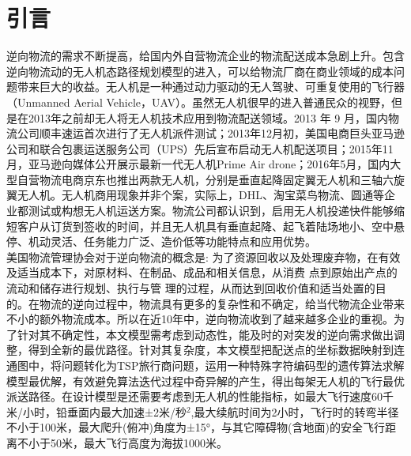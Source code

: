\documentclass[10.5pt,twocolumn]{jbuaa}
\begin{document}
	\wuhao 


	\enlargethispage{-3.3cm}
	\section{引言}
	逆向物流的需求不断提高，给国内外自营物流企业的物流配送成本急剧上升。包含逆向物流动的无人机态路径规划模型的进入，可以给物流厂商在商业领域的成本问题带来巨大的收益。无人机是一种通过动力驱动的无人驾驶、可重复使用的飞行器（Unmanned Aerial Vehicle，UAV）。虽然无人机很早的进入普通民众的视野，但是在2013年之前却无人将无人机技术应用到物流配送领域。2013 年 9
	月，国内物流公司顺丰速运首次进行了无人机派件测试；2013年12月初，美国电商巨头亚马逊公司和联合包裹运送服务公司（UPS）先后宣布启动无人机配送项目；2015年11月，亚马逊向媒体公开展示最新一代无人机Prime Air drone；2016年5月，国内大型自营物流电商京东也推出两款无人机，分别是垂直起降固定翼无人机和三轴六旋翼无人机。无人机商用现象并非个案，实际上，DHL、淘宝菜鸟物流、圆通等企业都测试或构想无人机运送方案。物流公司都认识到，启用无人机投递快件能够缩短客户从订货到签收的时间，并且无人机具有垂直起降、起飞着陆场地小、空中悬停、机动灵活、任务能力广泛、造价低等功能特点和应用优势。
	\\\indent{}美国物流管理协会对于逆向物流的概念是: 为了资源回收以及处理废弃物，在有效及适当成本下，对原材料、在制品、成品和相关信息，从消费 点到原始出产点的流动和储存进行规划、执行与管 理的过程，从而达到回收价值和适当处置的目的。在物流的逆向过程中，物流具有更多的复杂性和不确定，给当代物流企业带来不小的额外物流成本。所以在近10年中，逆向物流收到了越来越多企业的重视。为了针对其不确定性，本文模型需考虑到动态性，能及时的对突发的逆向需求做出调整，得到全新的最优路径。针对其复杂度，本文模型把配送点的坐标数据映射到连通图中，将问题转化为TSP旅行商问题，运用一种特殊字符编码型的遗传算法求解模型最优解，有效避免算法迭代过程中奇异解的产生，得出每架无人机的飞行最优派送路径。在设计模型是还需要考虑到无人机的性能指标，如最大飞行速度60千米/小时，铅垂面内最大加速±2米/秒$^{2}$,最大续航时间为2小时，飞行时的转弯半径不小于100米，最大爬升(俯冲)角度为±15°，与其它障碍物(含地面)的安全飞行距离不小于50米，最大飞行高度为海拔1000米。
	\enlargethispage{-3.3cm}
\end{document}
